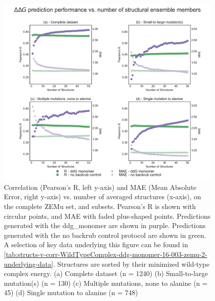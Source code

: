 \begin{figure}
  \includegraphics[width=\textwidth,keepaspectratio]{structs-v-corr-WildTypeComplex-ddg-monomer-16-003-zemu-2.pdf}
  \caption[]{ %
    Correlation (Pearson's R, left y-axis) and MAE (Mean Absolute Error, right y-axis) vs. number of averaged structures (x-axis), on the complete ZEMu set, and subsets.
    Pearson's R is shown with circular points, and MAE with faded plus-shaped points.
    Predictions generated with the ddg\_monomer are shown in purple.
    Predictions generated with the no backrub control protocol are shown in green.
    A selection of key data underlying this figure can be found in \cref{tab:structs-v-corr-WildTypeComplex-ddg-monomer-16-003-zemu-2-underlying-data}.
    Structures are sorted by their minimized wild-type complex energy.
    (a) Complete dataset (n = 1240)
    (b) Small-to-large mutation(s) (n = 130)
    (c) Multiple mutations, none to alanine (n = 45)
    (d) Single mutation to alanine (n = 748)
  } \label{fig:structs-v-corr-WildTypeComplex-ddg-monomer-16-003-zemu-2}
\end{figure}
